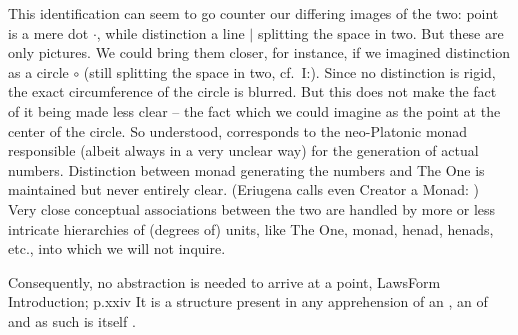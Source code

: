 {  This identification can seem to go counter our differing images of the
  two: point is a mere dot $\cdot$, while distinction a line $|$
  splitting the space in two. But these are only pictures. We could bring them
  closer, for instance, if we imagined distinction as a circle $\circ$ (still
  splitting the space in two, cf.~I:). Since no distinction is
  rigid, the exact 
  circumference of the circle is blurred. But this does not make the fact of it
  being made less clear -- the fact which we could imagine as the point at the
  center of the circle. So understood,  corresponds to the
  neo-Platonic monad responsible (albeit always in a very unclear way) for the
  generation of actual numbers.  
  Distinction between monad generating the numbers and The One is maintained but
  never entirely clear.  (Eriugena calls even Creator a Monad: ) Very close conceptual associations between
  the two are handled by more or less intricate hierarchies of (degrees of)
  units, like The One, monad, henad, henads, etc., into which we will not
  inquire.  }


Consequently, no abstraction is needed to arrive at a point, \citet{we have a
  direct awareness of mathematical form as an archetypal structure.}{LawsForm}{
  Introduction; p.xxiv\label{cit:numberArchetyp}} It is a structure present in any apprehension of an
, an  of  and as such is itself
.

